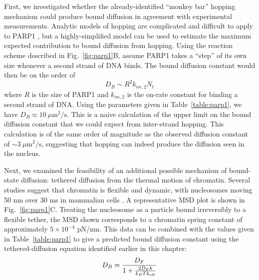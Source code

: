 First, we investigated whether the already-identified ``monkey bar'' hopping mechanism could produce bound diffusion in agreement with experimental measurements.   Analytic models of hopping are complicated and difficult to apply to PARP1 \cite{yang18}, but a highly-simplified model can be used to estimate the maximum expected contribution to bound diffusion from hopping.   Using the reaction scheme described in Fig.~\ref{fig:parp1}B, assume PARP1 takes a ``step'' of its own size whenever a second strand of DNA binds.  The bound diffusion constant would then be on the order of $$D_B \sim R^2 k_{on,2} N_t$$ where $R$ is the size of PARP1 and $k_{on,2}$ is the on-rate constant for binding a second strand of DNA.  Using the parameters given in Table~\ref{table:parp1}, we have $D_B \approx 10\ \mu\mathrm{m}^2/\mathrm{s}$.  This is a naive calculation of the upper limit on the bound diffusion constant that we could expect from inter-strand hopping.  This calculation is of the same order of magnitude as the observed diffusion constant of $\sim 3\ \mu\mathrm{m}^2/\mathrm{s}$, suggesting that hopping can indeed produce the diffusion seen in the nucleus.


Next, we examined the feasibility of an additional possible mechanism of bound-state diffusion: tethered diffusion from the thermal motion of chromatin.  Several studies suggest that chromatin is flexible and dynamic, with nucleosomes moving 50 nm over 30 ms in mammalian cells \cite{nozaki17, maeshima16, hihara12,nozaki13}.  A representative MSD plot is shown in Fig.~\ref{fig:parp1}C.  Treating the nucleosome as a particle bound irreversibly to a flexible tether, the MSD shown corresponds to a chromatin spring constant of approximately $5\times 10^{-4}$ pN/nm.  This data can be combined with the values given in Table~\ref{table:parp1} to give a predicted bound diffusion constant  using the tethered-diffusion equation identified earlier in this chapter:
\begin{equation}
D_B = \frac{D_F}{1+\frac{2D_Fk}{k_BTk_{\rm off}}}
\end{equation}

